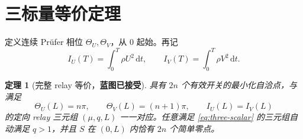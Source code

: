 \documentclass[UTF8,12pt,openany,fontset=fandol]{ctexrep}
\newtheorem{theorem}{定理}[chapter]
\theoremstyle{definition}
\newcommand{\dd}{\,\mathrm d}
\newcommand{\Trusted}{\textcolor{green!45!black}{\textbf{蓝图已接受}}}
\begin{document}
\section{三标量等价定理}

定义连续 Prüfer 相位 $\Theta_U,\Theta_V$，从 $0$ 起始。再记
\begin{equation}
 I_U(T)=\int_0^T\rho U^2\dd t,\qquad
 I_V(T)=\int_0^T\rho V^2\dd t.
\end{equation}

\begin{theorem}[完整 relay 等价，\Trusted]\label{thm:full-relay}
具有 $2n$ 个有效开关的最小化自洽点，与满足
\begin{equation}\label{eq:three-scalar}
 \Theta_U(L)=n\pi,\qquad
 \Theta_V(L)=(n+1)\pi,\qquad
 I_U(L)=I_V(L)
\end{equation}
的定向 relay 三元组 $(\mu,q,L)$ 一一对应。任意满足 \eqref{eq:three-scalar} 的三元组自动满足 $q>1$，并且 $S$ 在 $(0,L)$ 内恰有 $2n$ 个简单零点。
\end{theorem}
\end{document}
